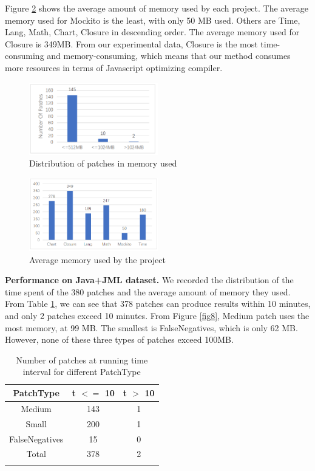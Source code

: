 \documentclass[sn-basic]{sn-jnl}
\theoremstyle{thmstyleone}
\theoremstyle{thmstyletwo}
\theoremstyle{thmstylethree}
\begin{document}
Figure \ref{fig7} shows the average amount of memory used by each project. The  average memory used for Mockito is the least, with only 50 MB used. Others are Time, Lang, Math, Chart, Closure in descending order. The average memory used for Closure is 349MB. From our experimental data, Closure is the most time-consuming and memory-consuming, which means that our method consumes more resources in terms of Javascript optimizing compiler.

\begin{figure}[ht]%
	\centering
	\includegraphics[width=0.5\textwidth]{fig6.png}
	\caption{Distribution of patches in memory used}\label{fig6}
\end{figure}

\begin{figure}[h]%
	\centering
	\includegraphics[width=0.5\textwidth]{fig7.png}
	\caption{Average memory used by the project}\label{fig7}
\end{figure}

\textbf{Performance on Java+JML dataset.} We recorded the distribution of the time spent of the 380 patches and the average amount of memory they used. From Table \ref{tab8}, we can see that 378 patches can produce results within 10 minutes, and only 2 patches exceed 10 minutes. From Figure \ref{fig8}, Medium patch uses the most memory, at 99 MB. The smallest is FalseNegatives, which is only 62 MB. However, none of these three types of patches exceed 100MB.

\begin{table}[ht]
	\begin{center}
		\begin{minipage}{173px}
			\caption{Number of patches at running time interval for different PatchType}\label{tab8}%
			\begin{tabular}{ccc}
				\toprule
				PatchType & t $<=$ 10 & t $>$ 10
				\\
				\midrule
				Medium    &143 &1  \\
				Small    &200 &1     \\
				FalseNegatives    &15 &0    \\
				Total    &378 &2    \\
				\botrule
			\end{tabular}
		\end{minipage}
	\end{center}
\end{table}
\end{document}

